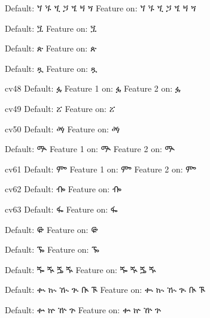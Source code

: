 \IndSS Default: ጘ ጙ ጚ ጛ ጜ ጝ ጞ
\IndSS\OTfortyoneone Feature on: ጘ ጙ ጚ ጛ ጜ ጝ ጞ

\IndSS Default: ጟ
\IndSS\OTfortytwoone Feature on: ጟ

\IndSS Default: ጵ
\IndSS\OTfortyfive Feature on: ጵ

\IndSS Default: ጿ
\IndSS\OTfortysix Feature on: ጿ

\IndSS cv48 Default: ፏ
\IndSS\OTfortyeightone Feature 1 on: ፏ
\IndSS\OTfortyeighttwo Feature 2 on: ፏ

\IndSS cv49 Default: ፘ
\IndSS\OTfortynine Feature on: ፘ

\IndSS cv50 Default: ፙ
\IndSS\OTfifty Feature on: ፙ

\IndSS Default: ᎁ
\IndSS\OTsixtyone Feature 1 on: ᎁ
\IndSS\OTsixtytwo Feature 2 on: ᎁ

\IndSS cv61  Default: ᎃ
\IndSS\OTsixtyoneone Feature 1 on: ᎃ
\IndSS\OTsixtyonetwo Feature 2 on: ᎃ

\IndSS cv62 Default: ᎇ
\IndSS\OTsixtytwoone Feature on: ᎇ

\IndSS cv63 Default: ᎊ
\IndSS\OTsixtythree Feature on: ᎊ

\IndSS Default: ᎋ
\IndSS\OTsixtyfour Feature on: ᎋ

\IndSS Default: ᎏ
\IndSS\OTsixtyfive Feature on: ᎏ

\IndSS Default: ⶓ ⶔ ⶕ ⶖ
\IndSS\OTseventy Feature on: ⶓ ⶔ ⶕ ⶖ

\IndSS Default: ቊ ኲ ዂ ጒ ᎅ ᎍ
\IndSS\OTeighty Feature on: ቊ ኲ ዂ ጒ ᎅ ᎍ

\IndSS Default: ቍ ኵ ዅ ጕ 
\IndSS\OTeightyfive Feature on: ቍ ኵ ዅ ጕ


\bye
